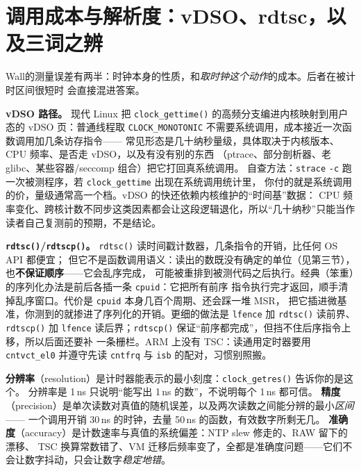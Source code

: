 \documentclass[12pt,a4paper,fontset=fandol]{ctexbook}
\newcommand{\Fn}[1]{\texttt{#1()}}
\newcommand{\Tp}[1]{\texttt{#1}}
\newcommand{\Bk}{\discretionary{}{}{}}
\newcommand{\Lang}[1]{\textsf{#1}}
\newcommand{\MWall}{\Lang{Wall}}
\begin{document}
\section{调用成本与解析度：vDSO、rdtsc，以及三词之辨}
\label{sec:pm02-cost}

\MWall 的测量误差有两半：时钟本身的性质，和\emph{取时钟这个动作}的成本。后者在被计时区间很短时
会直接混进答案。

\textbf{vDSO 路径。} 现代 Linux 把 \Fn{clock{\Bk}\_gettime} 的高频分支编进内核映射到用户态的
vDSO 页：普通线程取 \Tp{CLOCK{\Bk}\_MONOTONIC} 不需要系统调用，成本接近一次函数调用加几条访存指令——
常见形态是几十纳秒量级，具体取决于内核版本、CPU 频率、是否走 vDSO，以及有没有别的东西
（ptrace、部分剖析器、老 glibc、某些容器/seccomp 组合）把它打回真系统调用。
自查方法：\Tp{strace} \Tp{-c} 跑一次被测程序，若 \Tp{clock{\Bk}\_gettime} 出现在系统调用统计里，
你付的就是系统调用的价，量级通常高一个档。vDSO 的快还依赖内核维护的``时间基''数据：
CPU 频率变化、跨核计数不同步这类因素都会让这段逻辑退化，所以``几十纳秒''只能当作
读者自己复测前的预期，不是结论。

\textbf{\Fn{rdtsc}/\Fn{rdtscp}。} \Fn{rdtsc} 读时间戳计数器，几条指令的开销，比任何 OS API 都便宜；
但它不是函数调用语义：读出的数既没有确定的单位（见第三节），也\textbf{不保证顺序}——它会乱序完成，
可能被重排到被测代码之后执行。经典（笨重）的序列化办法是前后各插一条 \Tp{cpuid}：它把所有前序
指令执行完才返回，顺手清掉乱序窗口。代价是 \Tp{cpuid} 本身几百个周期、还会踩一堆 MSR，
把它插进微基准，你测到的就掺进了序列化的开销。更细的做法是 \Tp{lfence} 加 \Fn{rdtsc} 读前界、
\Fn{rdtscp} 加 \Tp{lfence} 读后界；\Fn{rdtscp} 保证``前序都完成''，但挡不住后序指令上移，所以后面还要补
一条栅栏。ARM 上没有 TSC：读通用定时器要用 \Tp{cntvct{\Bk}\_el0} 并遵守先读 \Tp{cntfrq} 与 \Tp{isb}
的配对，习惯别照搬。

\begin{guideline}[title={分辨率、精度、准确度：三个词不许混用}, label={box:pm02-3words}]
\textbf{分辨率}（resolution）是计时器能表示的最小刻度：\Fn{clock{\Bk}\_getres} 告诉你的是这个。
分辨率是 1\,ns 只说明``能写出 1\,ns 的数''，不说明每个 1\,ns 都可信。\newline
\textbf{精度}（precision）是单次读数对真值的随机误差，以及两次读数之间能分辨的最小\emph{区间}——
一个调用开销 30\,ns 的时钟，去量 50\,ns 的函数，有效数字所剩无几。\newline
\textbf{准确度}（accuracy）是计数速率与真值的系统偏差：NTP slew 修走的、RAW 留下的漂移、
TSC 换算常数错了、VM 迁移后频率变了，全都是准确度问题——它们不会让数字抖动，只会让数字\emph{稳定地错}。
\end{guideline}
\end{document}

